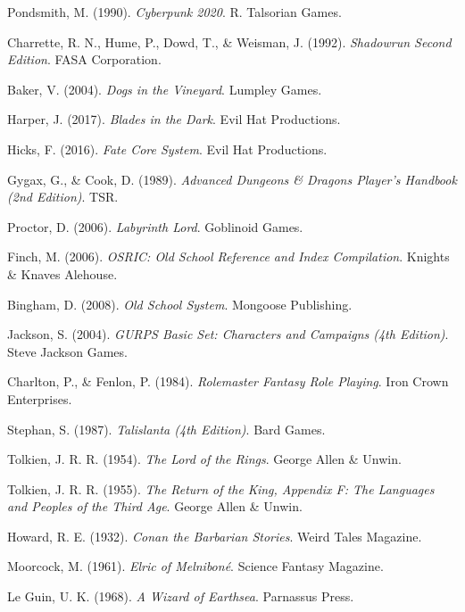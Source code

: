 Pondsmith, M. (1990).
\textit{Cyberpunk 2020}.
R. Talsorian Games.

Charrette, R. N., Hume, P., Dowd, T., \& Weisman, J. (1992).
\textit{Shadowrun Second Edition}.
FASA Corporation.

Baker, V. (2004).
\textit{Dogs in the Vineyard}.
Lumpley Games.

Harper, J. (2017).
\textit{Blades in the Dark}.
Evil Hat Productions.

Hicks, F. (2016).
\textit{Fate Core System}.
Evil Hat Productions.

Gygax, G., \& Cook, D. (1989).
\textit{Advanced Dungeons \& Dragons Player's Handbook (2nd Edition)}.
TSR.

Proctor, D. (2006).
\textit{Labyrinth Lord}.
Goblinoid Games.

Finch, M. (2006).
\textit{OSRIC: Old School Reference and Index Compilation}.
Knights \& Knaves Alehouse.

Bingham, D. (2008).
\textit{Old School System}.
Mongoose Publishing.

Jackson, S. (2004).
\textit{GURPS Basic Set: Characters and Campaigns (4th Edition)}.
Steve Jackson Games.

Charlton, P., \& Fenlon, P. (1984).
\textit{Rolemaster Fantasy Role Playing}.
Iron Crown Enterprises.

Stephan, S. (1987).
\textit{Talislanta (4th Edition)}.
Bard Games.

Tolkien, J. R. R. (1954).
\textit{The Lord of the Rings}.
George Allen \& Unwin.

Tolkien, J. R. R. (1955).
\textit{The Return of the King, Appendix F: The Languages and Peoples of the Third Age}.
George Allen \& Unwin.

Howard, R. E. (1932).
\textit{Conan the Barbarian Stories}.
Weird Tales Magazine.

Moorcock, M. (1961).
\textit{Elric of Melniboné}.
Science Fantasy Magazine.

Le Guin, U. K. (1968).
\textit{A Wizard of Earthsea}.
Parnassus Press.

